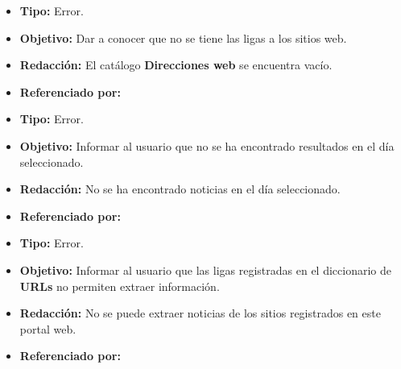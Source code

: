   
    \begin{itemize}
      \item \textbf{Tipo:} Error. 
      \item \textbf{Objetivo:}  Dar a conocer que no se tiene las ligas a los sitios web.
      \item \textbf{Redacción:} El catálogo \textbf{Direcciones web} se encuentra vacío.
      \item \textbf{Referenciado por:} \\
    \end{itemize}

  \begin{itemize}
    \item \textbf{Tipo:} Error. 
    \item \textbf{Objetivo:}  Informar al usuario que no se ha encontrado resultados en el día seleccionado.
    \item \textbf{Redacción:}  No se ha encontrado noticias en el día seleccionado.

    \item \textbf{Referenciado por:} \\
  \end{itemize}

  \begin{itemize}
    \item \textbf{Tipo:} Error. 
    \item \textbf{Objetivo:}  Informar al usuario que las ligas registradas en el diccionario de \textbf{URLs} no permiten extraer información.
    \item \textbf{Redacción:} No se puede extraer noticias de los sitios registrados en este portal web.
    \item \textbf{Referenciado por:} \\
  \end{itemize}

